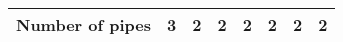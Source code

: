 \begin{landscape}
\begin{table}[h]
\begin{tabular}{llllllll}
\textbf{Number of pipes}                                                       & 3                                                                                  & 2                                                                           & 2                                                                                                     & 2                                                                                 & 2                                                                        & 2                                                                     & 2       \\
\bottomrule
\end{tabular}
\end{table}

\end{landscape}
